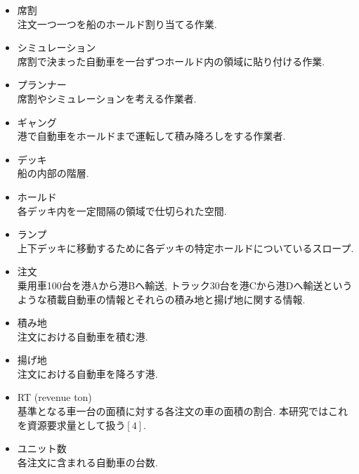 \begin{itemize}

\item 席割 \\
注文一つ一つを船のホールド割り当てる作業.

\item シミュレーション \\
席割で決まった自動車を一台ずつホールド内の領域に貼り付ける作業.

\item  プランナー \\
席割やシミュレーションを考える作業者.

\item  ギャング\\
港で自動車をホールドまで運転して積み降ろしをする作業者.

\item デッキ \\
船の内部の階層.

\item ホールド \\
各デッキ内を一定間隔の領域で仕切られた空間.

\item ランプ \\
上下デッキに移動するために各デッキの特定ホールドについているスロープ.

\item 注文 \\
乗用車100台を港Aから港Bへ輸送, トラック30台を港Cから港Dへ輸送というような積載自動車の情報とそれらの積み地と揚げ地に関する情報.

\item 積み地 \\
注文における自動車を積む港.

\item 揚げ地 \\
注文における自動車を降ろす港.

\item  RT (revenue ton) \\
基準となる車一台の面積に対する各注文の車の面積の割合. 本研究ではこれを資源要求量として扱う$[4]$.

\item ユニット数 \\
各注文に含まれる自動車の台数.

\end{itemize}


